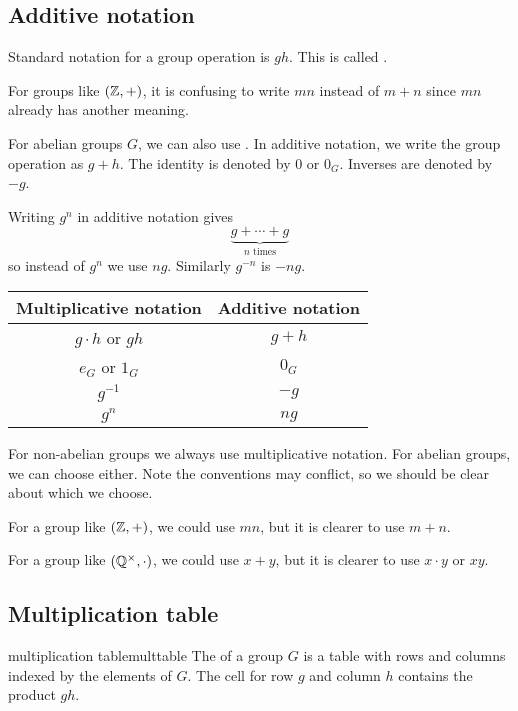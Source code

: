 \documentclass[12pt,letterpaper]{report}
\begin{document}
\pagebreak
\subsection{Additive notation}

Standard notation for a group operation is $gh$.
This is called .

For groups like $(\mathbb{Z}, +)$, it is confusing to write $mn$ instead of $m + n$ since $mn$
already has another meaning.

For abelian groups $G$, we can also use .
In additive notation, we write the group operation as $g + h$.
The identity is denoted by $0$ or $0_G$.
Inverses are denoted by $-g$.

Writing $g^n$ in additive notation gives
\[ \underbrace{g + \cdots + g}_{n \text{ times}} \]
so instead of $g^n$ we use $ng$.
Similarly $g^{-n}$ is $-ng$.

\begin{center}
  \renewcommand{\arraystretch}{1.2}
  \begin{tabular}{cc}
    Multiplicative notation & Additive notation \\
    \hline
    $g \cdot h$ or $gh$ & $g + h$ \\
    $e_G$ or $1_G$ & $0_G$ \\
    $g^{-1}$ & $-g$ \\
    $g^n$ & $ng$ \\
  \end{tabular}
\end{center}

For non-abelian groups we always use multiplicative notation.
For abelian groups, we can choose either.
Note the conventions may conflict, so we should be clear about which we choose.

For a group like $(\mathbb{Z}, +)$, we could use $mn$, but it is clearer to use $m + n$.

For a group like $(\mathbb{Q}^\times, \cdot)$, we could use $x + y$, but it is clearer to use
$x \cdot y$ or $xy$.

\pagebreak
\subsection{Multiplication table}

\begin{defn}{multiplication table}{multtable}
  The  of a group $G$ is a table with rows and columns indexed by the
  elements of $G$.
  The cell for row $g$ and column $h$ contains the product $gh$.
\end{defn}
\end{document}
